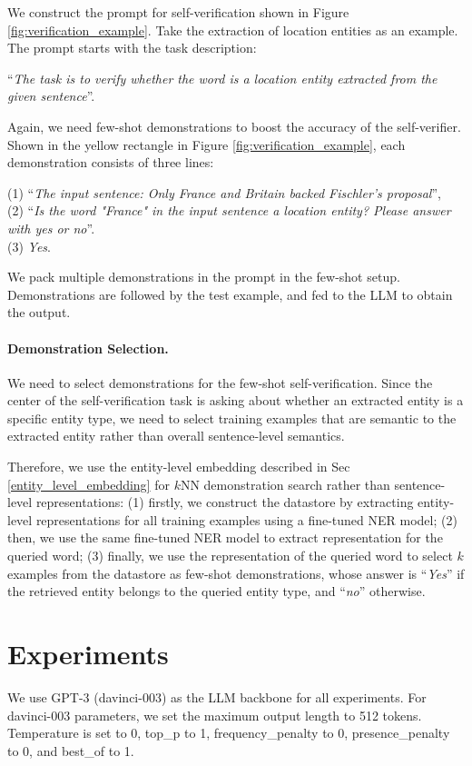 \documentclass[11pt]{article}
\begin{document}
We construct the prompt for self-verification shown in Figure \ref{fig:verification_example}. 
Take the extraction of location entities as an example. 
The prompt starts with the task description:

“\textit{The task is to verify whether the word is a location entity extracted from the given sentence}”. 

Again, we need few-shot demonstrations to boost the accuracy of the self-verifier. 
Shown in the yellow rectangle in Figure \ref{fig:verification_example}, 
each demonstration consists of three lines: 

\noindent (1) “\textit{The input sentence: Only France and Britain backed Fischler's proposal}”, \\
(2) “\textit{Is the word "France" in the input sentence a location entity? Please answer with yes or no}”. \\
(3) \textit{Yes}.

We pack multiple demonstrations in the prompt in the few-shot setup. Demonstrations are followed by the test example, and fed to the LLM to obtain the output.

\paragraph{Demonstration Selection.}
We need to select demonstrations for the few-shot self-verification. 
Since the center of the self-verification task is asking about whether an extracted entity is a specific entity type, 
we need to select training examples that are semantic to the extracted entity rather than overall sentence-level semantics. 

Therefore, we use the entity-level embedding described in 
Sec \ref{entity_level_embedding} for $k$NN demonstration search rather than sentence-level representations: (1) firstly, we construct the datastore by extracting entity-level representations for all training examples using a fine-tuned NER model; (2) then, we use the same fine-tuned NER model to extract representation for the queried word; (3) finally, we use the representation of the queried word to select $k$ examples from the datastore as few-shot demonstrations, whose answer is “\textit{Yes}” if the retrieved entity belongs to the queried entity type, 
and  “\textit{no}”  otherwise. 

\section{Experiments}
\label{experiments}
We use GPT-3 \cite{brown2020language} (davinci-003) as the LLM backbone for all experiments. 
For davinci-003 parameters, we set the maximum output length to 512 tokens. Temperature is set to 0, 
top\_p to 1, frequency\_penalty to 0, presence\_penalty to 0, and best\_of to 1.
\end{document}
